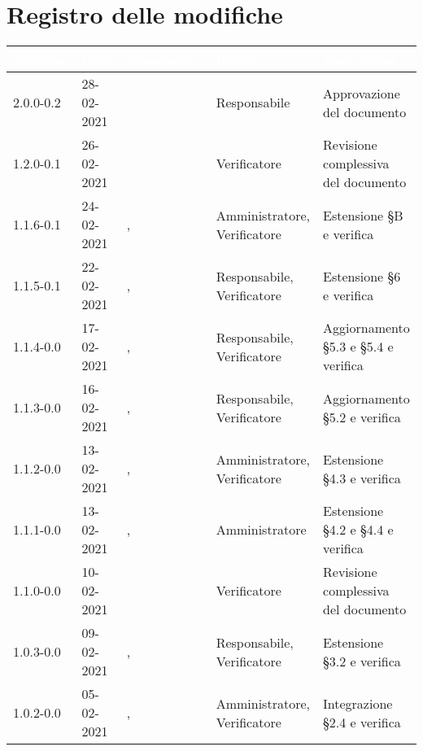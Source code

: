 \section*{Registro delle modifiche}
{
\setcounter{table}{-1}
{
\renewcommand{\arraystretch}{1.5}
\centering
\begin{longtable}{C{1.7cm} C{2.5cm} C{3.2cm} C{2.7cm} C{4.8cm}}
\textcolor{white}{\textbf{Versione}}&
\textcolor{white}{\textbf{Data}}&
\textcolor{white}{\textbf{Nominativo}}&
\textcolor{white}{\textbf{Ruolo}}&
\textcolor{white}{\textbf{Descrizione}}\\	
\endhead

2.0.0-0.2 & 28-02-2021 & \ZM{} & Responsabile & Approvazione del documento\\

1.2.0-0.1 & 26-02-2021 & \SP{} & Verificatore & Revisione complessiva del documento\\

1.1.6-0.1 & 24-02-2021 & \SG{}, \SP{} & Amministratore, Verificatore & Estensione \S B e verifica\\

1.1.5-0.1 & 22-02-2021 & \ZM{}, \SP{} & Responsabile, Verificatore & Estensione \S 6 e verifica\\

1.1.4-0.0 & 17-02-2021 & \PA{}, \ZM{} & Responsabile, Verificatore & Aggiornamento \S 5.3 e \S 5.4 e verifica\\

1.1.3-0.0 & 16-02-2021 & \PA{}, \ZM{} & Responsabile, Verificatore & Aggiornamento \S 5.2 e verifica\\

1.1.2-0.0 & 13-02-2021 & \BM{}, \ZM{} & Amministratore, Verificatore & Estensione \S 4.3 e verifica\\

1.1.1-0.0 & 13-02-2021 & \SG{}, \ZM{} & Amministratore & Estensione \S 4.2 e \S 4.4 e verifica\\

1.1.0-0.0 & 10-02-2021 & \ZM{} & Verificatore & Revisione complessiva del documento\\

1.0.3-0.0 & 09-02-2021 & \PA{}, \SP{} & Responsabile, Verificatore & Estensione \S 3.2 e verifica\\

1.0.2-0.0 & 05-02-2021& \BM{}, \SP{} & Amministratore, Verificatore & Integrazione \S 2.4 e verifica\\


\end{longtable}}}
